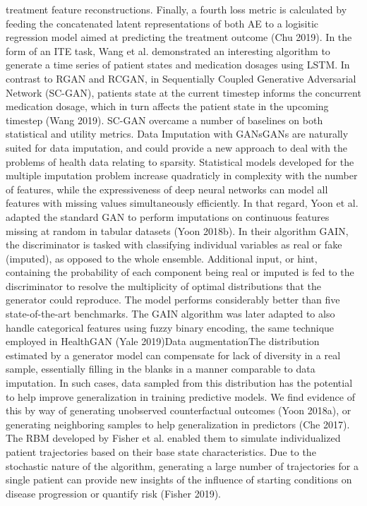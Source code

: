 treatment feature reconstructions. Finally, a fourth loss metric is calculated by feeding the concatenated latent representations of both AE to a logisitic regression model aimed at predicting the treatment outcome (Chu 2019). In the form of an ITE task, Wang et al. demonstrated an interesting algorithm to generate a time series of patient states and medication dosages using LSTM. In contrast to RGAN and RCGAN, in Sequentially Coupled Generative Adversarial Network (SC-GAN), patients state at the current timestep informs the concurrent medication dosage, which in turn affects the patient state in the upcoming timestep (Wang 2019). SC-GAN overcame a number of baselines on both statistical and utility metrics. Data Imputation with GANsGANs are naturally suited for data imputation, and could provide a new approach to deal with the problems of health data relating to sparsity. Statistical models developed for the multiple imputation problem increase quadraticly in complexity with the number of features, while the expressiveness of deep neural networks can model all features with missing values simultaneously efficiently. In that regard, Yoon et al. adapted the standard GAN to perform imputations on continuous features missing at random in tabular datasets (Yoon 2018b). In their algorithm GAIN, the discriminator is tasked with classifying individual variables as real or fake (imputed), as opposed to the whole ensemble. Additional input, or hint, containing the probability of each component being real or imputed is fed to the discriminator to resolve the multiplicity of optimal distributions that the generator could reproduce. The model performs considerably better than five state-of-the-art benchmarks. The GAIN algorithm was later adapted to also handle categorical features using fuzzy binary encoding, the same technique employed in HealthGAN (Yale 2019)Data augmentationThe distribution estimated by a generator model can compensate for lack of diversity in a real sample, essentially filling in the blanks in a manner comparable to data imputation. In such cases, data sampled from this distribution has the potential to help improve generalization in training predictive models. We find evidence of this by way of generating unobserved counterfactual outcomes (Yoon 2018a), or generating neighboring samples to help generalization in predictors (Che 2017). The RBM developed by Fisher et al. enabled them to simulate individualized patient trajectories based on their base state characteristics. Due to the stochastic nature of the algorithm, generating a large number of trajectories for a single patient can provide new insights of the influence of starting conditions on disease progression or quantify risk (Fisher 2019).

